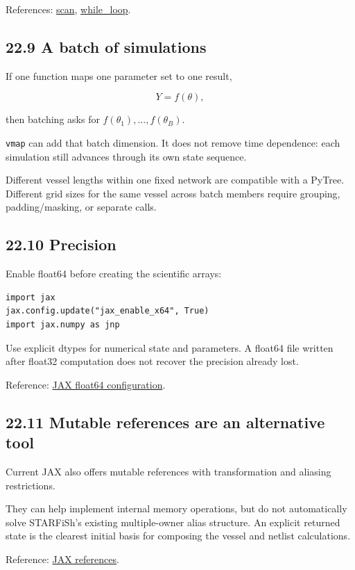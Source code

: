 \documentclass[11pt,a4paper]{article}
\begin{document}
References: \href{https://docs.jax.dev/en/latest/_autosummary/jax.lax.scan.html}{scan}, \href{https://docs.jax.dev/en/latest/_autosummary/jax.lax.while_loop.html}{while\_loop}.

\subsection{22.9 A batch of simulations}
If one function maps one parameter set to one result,


\begingroup\small
\[
Y=f(\theta),
\]
\endgroup


then batching asks for \(f(\theta_1),\ldots,f(\theta_B)\).

\texttt{vmap} can add that batch dimension. It does not remove time dependence: each simulation still advances through its own state sequence.

Different vessel lengths within one fixed network are compatible with a PyTree. Different grid sizes for the same vessel across batch members require grouping, padding/masking, or separate calls.

\subsection{22.10 Precision}
Enable float64 before creating the scientific arrays:


\begin{lstlisting}
import jax
jax.config.update("jax_enable_x64", True)
import jax.numpy as jnp
\end{lstlisting}
Use explicit dtypes for numerical state and parameters. A float64 file written after float32 computation does not recover the precision already lost.

Reference: \href{https://docs.jax.dev/en/latest/101/default_dtypes.html}{JAX float64 configuration}.

\subsection{22.11 Mutable references are an alternative tool}
Current JAX also offers mutable references with transformation and aliasing restrictions.

They can help implement internal memory operations, but do not automatically solve STARFiSh's existing multiple-owner alias structure. An explicit returned state is the clearest initial basis for composing the vessel and netlist calculations.

Reference: \href{https://docs.jax.dev/en/latest/array_refs.html}{JAX references}.
\end{document}
